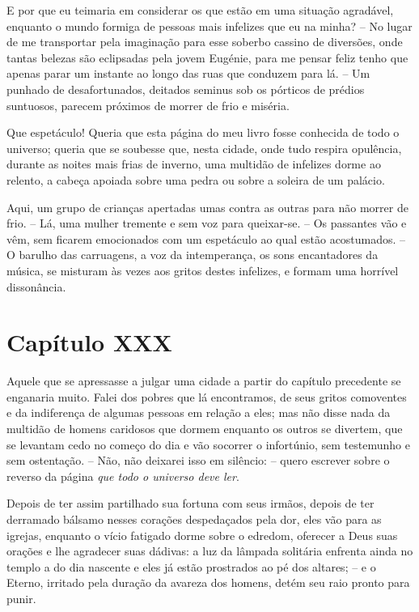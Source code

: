  E por que eu teimaria em considerar os que estão em uma situação
agradável, enquanto o mundo formiga de pessoas mais infelizes que eu na
minha? -- No lugar de me transportar pela imaginação para esse soberbo
cassino de diversões, onde tantas belezas são eclipsadas pela jovem
Eugénie, para me pensar feliz tenho que apenas parar um instante ao
longo das ruas que conduzem para lá. -- Um punhado de desafortunados,
deitados seminus sob os pórticos de prédios suntuosos, parecem
próximos de morrer de frio e miséria.

 Que espetáculo! Queria que esta página do meu livro fosse conhecida de
todo o universo; queria que se soubesse que, nesta cidade, onde tudo
respira opulência, durante as noites mais frias de inverno, uma
multidão de infelizes dorme ao relento, a cabeça apoiada sobre uma
pedra ou sobre a soleira de um palácio.

 Aqui, um grupo de crianças apertadas umas contra as outras para não
morrer de frio. -- Lá, uma mulher tremente e sem voz para queixar-se.
-- Os passantes vão e vêm, sem ficarem emocionados com um espetáculo
ao qual estão acostumados. -- O barulho das carruagens, a voz da
intemperança, os sons encantadores da música, se misturam às vezes aos
gritos destes infelizes, e formam uma horrível dissonância.

\section*{Capítulo XXX}

 Aquele que se apressasse a julgar uma cidade a partir do capítulo
precedente se enganaria muito. Falei dos pobres que lá encontramos, de
seus gritos comoventes e da indiferença de algumas pessoas em relação a
eles; mas não disse nada da multidão de homens caridosos que dormem
enquanto os outros se divertem, que se levantam cedo no começo do dia e
vão socorrer o infortúnio, sem testemunho e sem ostentação. -- Não,
não deixarei isso em silêncio: -- quero escrever sobre o reverso da
página \textit{que todo o universo deve ler}.

 Depois de ter assim partilhado sua fortuna com seus irmãos, depois de
ter derramado bálsamo nesses corações despedaçados pela dor, eles vão
para as igrejas, enquanto o vício fatigado dorme sobre o edredom,
oferecer a Deus suas orações e lhe agradecer suas dádivas: a luz da
lâmpada solitária enfrenta ainda no templo a do dia nascente e eles já
estão prostrados ao pé dos altares; -- e o Eterno, irritado pela
duração da avareza dos homens, detém seu raio pronto para punir.

